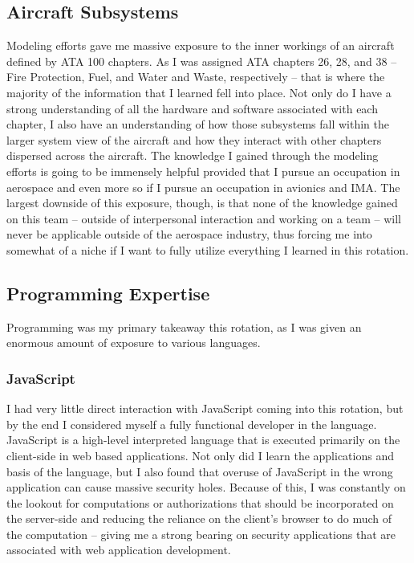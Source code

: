 \documentclass{article}
\begin{document}
\subsection{Aircraft Subsystems}
Modeling efforts gave me massive exposure to the inner workings of an aircraft defined by ATA 100 chapters. As I was assigned ATA chapters 26, 28, and 38 -- Fire Protection, Fuel, and Water and Waste, respectively -- that is where the majority of the information that I learned fell into place. Not only do I have a strong understanding of all the hardware and software associated with each chapter, I also have an understanding of how those subsystems fall within the larger system view of the aircraft and how they interact with other chapters dispersed across the aircraft.
The knowledge I gained through the modeling efforts is going to be immensely helpful provided that I pursue an occupation in aerospace and even more so if I pursue an occupation in avionics and IMA. The largest downside of this exposure, though, is that none of the knowledge gained on this team -- outside of interpersonal interaction and working on a team -- will never be applicable outside of the aerospace industry, thus forcing me into somewhat of a niche if I want to fully utilize everything I learned in this rotation.

\subsection{Programming Expertise}
Programming was my primary takeaway this rotation, as I was given an enormous amount of exposure to various languages.
\subsubsection{JavaScript}
I had very little direct interaction with JavaScript coming into this rotation, but by the end I considered myself a fully functional developer in the language. JavaScript is a high-level interpreted language that is executed primarily on the client-side in web based applications. Not only did I learn the applications and basis of the language, but I also found that overuse of JavaScript in the wrong application can cause massive security holes. Because of this, I was constantly on the lookout for computations or authorizations that should be incorporated on the server-side and reducing the reliance on the client's browser to do much of the computation -- giving me a strong bearing on security applications that are associated with web application development.
\end{document}
